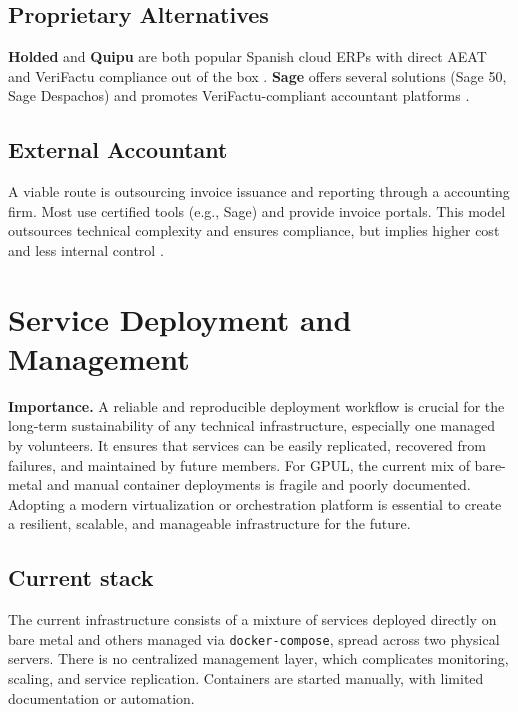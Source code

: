 \subsection*{Proprietary Alternatives}

\textbf{Holded} and \textbf{Quipu} are both popular Spanish cloud ERPs with direct AEAT and VeriFactu compliance out of the box \cite{holded-verifactu}. \textbf{Sage} offers several solutions (Sage 50, Sage Despachos) and promotes VeriFactu-compliant accountant platforms \cite{sage-verifactu}.

\subsection*{External Accountant}
A viable route is outsourcing invoice issuance and reporting through a accounting firm. Most use certified tools (e.g., Sage) and provide invoice portals. This model outsources technical complexity and ensures compliance, but implies higher cost and less internal control \cite{sage-blog-asesoria}.

\section{Service Deployment and Management}

\textbf{Importance.} A reliable and reproducible deployment workflow is crucial for the long-term sustainability of any technical infrastructure, especially one managed by volunteers. It ensures that services can be easily replicated, recovered from failures, and maintained by future members. For GPUL, the current mix of bare-metal and manual container deployments is fragile and poorly documented. Adopting a modern virtualization or orchestration platform is essential to create a resilient, scalable, and manageable infrastructure for the future.

\subsection*{Current stack}
The current infrastructure consists of a mixture of services deployed directly on bare metal and others managed via \texttt{docker-compose}, spread across two physical servers. There is no centralized management layer, which complicates monitoring, scaling, and service replication. Containers are started manually, with limited documentation or automation.

